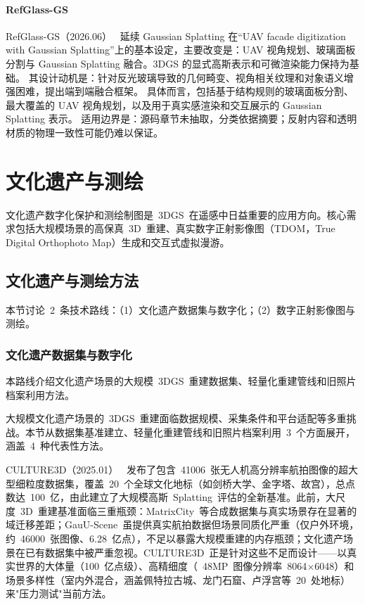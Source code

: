\paragraph{RefGlass-GS}
RefGlass-GS（2026.06）~\cite{2606_28826} 延续 Gaussian Splatting 在“UAV facade digitization with Gaussian Splatting”上的基本设定，主要改变是：UAV 视角规划、玻璃面板分割与 Gaussian Splatting 融合。3DGS 的显式高斯表示和可微渲染能力保持为基础。
其设计动机是：针对反光玻璃导致的几何畸变、视角相关纹理和对象语义增强困难，提出端到端融合框架。
具体而言，包括基于结构规则的玻璃面板分割、最大覆盖的 UAV 视角规划，以及用于真实感渲染和交互展示的 Gaussian Splatting 表示。
适用边界是：源码章节未抽取，分类依据摘要；反射内容和透明材质的物理一致性可能仍难以保证。
\section{文化遗产与测绘}
\label{sec:20_3}

文化遗产数字化保护和测绘制图是~3DGS~在遥感中日益重要的应用方向。核心需求包括大规模场景的高保真~3D~重建、真实数字正射影像图（TDOM，True Digital Orthophoto Map）生成和交互式虚拟漫游。

\subsection{文化遗产与测绘方法}
\label{ss:20_4}

本节讨论~2~条技术路线：（1）文化遗产数据集与数字化；（2）数字正射影像图与测绘。

\subsubsection{文化遗产数据集与数字化}

本路线介绍文化遗产场景的大规模~3DGS~重建数据集、轻量化重建管线和旧照片档案利用方法。

大规模文化遗产场景的~3DGS~重建面临数据规模、采集条件和平台适配等多重挑战。本节从数据集基准建立、轻量化重建管线和旧照片档案利用~3~个方面展开，涵盖~4~种代表性方法。

CULTURE3D（2025.01）~\cite{2501_06927} 发布了包含~41006~张无人机高分辨率航拍图像的超大型细粒度数据集，覆盖~20~个全球文化地标（如剑桥大学、金字塔、故宫），总点数达~100~亿，由此建立了大规模高斯~Splatting~评估的全新基准。此前，大尺度~3D~重建基准面临三重瓶颈：MatrixCity~等合成数据集与真实场景存在显著的域迁移差距；GauU-Scene~虽提供真实航拍数据但场景同质化严重（仅户外环境，约~46000~张图像、6.28~亿点），不足以暴露大规模重建的内存瓶颈；文化遗产场景在已有数据集中被严重忽视。CULTURE3D~正是针对这些不足而设计——以真实世界的大体量（100~亿点级）、高精细度（~48MP~图像分辨率~8064$\times$6048）和场景多样性（室内外混合，涵盖佩特拉古城、龙门石窟、卢浮宫等~20~处地标）来"压力测试"当前方法。

